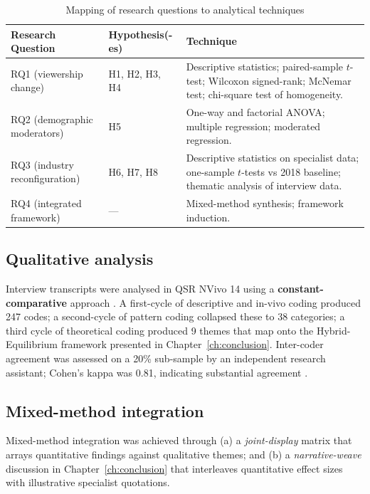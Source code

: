 \begin{table}[h]
\centering
\caption{Mapping of research questions to analytical techniques}
\label{tab:rq_method}
\small
\begin{tabular}{p{3.5cm} p{4.0cm} p{6.0cm}}
\toprule
\textbf{Research Question} & \textbf{Hypothesis(-es)} & \textbf{Technique}\\
\midrule
RQ1 (viewership change)  & H1, H2, H3, H4 &
Descriptive statistics; paired-sample $t$-test; Wilcoxon signed-rank;
McNemar test; chi-square test of homogeneity. \\
RQ2 (demographic moderators) & H5 &
One-way and factorial ANOVA; multiple regression; moderated regression. \\
RQ3 (industry reconfiguration) & H6, H7, H8 &
Descriptive statistics on specialist data; one-sample $t$-tests vs
2018 baseline; thematic analysis of interview data. \\
RQ4 (integrated framework) & --- &
Mixed-method synthesis; framework induction. \\
\bottomrule
\end{tabular}
\end{table}

\subsection{Qualitative analysis}

Interview transcripts were analysed in QSR NVivo 14 using a
\textbf{constant-comparative} approach
\citep{strauss1998,saldana2021}.  A first-cycle of descriptive and
in-vivo coding produced 247 codes; a second-cycle of pattern coding
collapsed these to 38 categories; a third cycle of theoretical
coding produced 9 themes that map onto the Hybrid-Equilibrium
framework presented in Chapter~\ref{ch:conclusion}.  Inter-coder
agreement was assessed on a 20\% sub-sample by an independent
research assistant; Cohen's kappa was 0.81, indicating substantial
agreement \citep{landis1977}.

\subsection{Mixed-method integration}

Mixed-method integration was achieved through (a) a
\emph{joint-display} matrix \citep{guetterman2015} that arrays
quantitative findings against qualitative themes; and (b) a
\emph{narrative-weave} discussion in Chapter~\ref{ch:conclusion}
that interleaves quantitative effect sizes with illustrative
specialist quotations.

